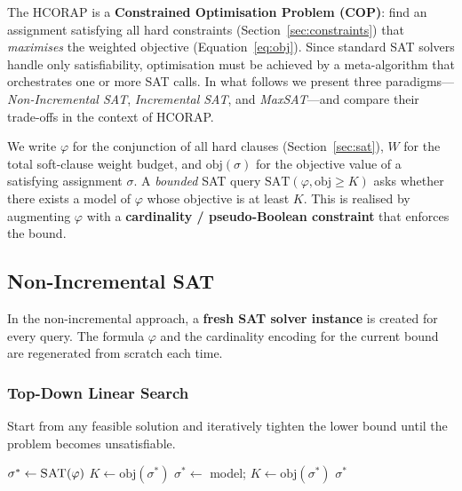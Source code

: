\documentclass[11pt,a4paper]{article}
\begin{document}
The HCORAP is a \textbf{Constrained Optimisation Problem (COP)}: find an
assignment satisfying all hard constraints (Section~\ref{sec:constraints}) that
\emph{maximises} the weighted objective
(Equation~\ref{eq:obj}).  Since standard SAT solvers handle only
satisfiability, optimisation must be achieved by a meta-algorithm that
orchestrates one or more SAT calls.  In what follows we present three
paradigms---\emph{Non-Incremental SAT}, \emph{Incremental SAT}, and
\emph{MaxSAT}---and compare their trade-offs in the context of HCORAP.

We write $\varphi$ for the conjunction of all hard clauses
(Section~\ref{sec:sat}), $W$ for the total soft-clause weight budget,
and $\mathrm{obj}(\sigma)$ for the objective value of a satisfying
assignment $\sigma$.
A \emph{bounded} SAT query $\mathrm{SAT}(\varphi, \mathrm{obj} \ge K)$
asks whether there exists a model of $\varphi$ whose objective is at
least $K$.  This is realised by augmenting $\varphi$ with a
\textbf{cardinality / pseudo-Boolean constraint} that enforces the bound.

\subsection{Non-Incremental SAT}\label{sec:opt-nonincr}

In the non-incremental approach, a \textbf{fresh SAT solver instance} is
created for every query.  The formula $\varphi$ and the cardinality encoding
for the current bound are regenerated from scratch each time.

\subsubsection{Top-Down Linear Search}

Start from any feasible solution and iteratively tighten the lower bound until
the problem becomes unsatisfiable.

\begin{algorithm}[H]
\caption{Non-Incremental Top-Down Linear Search (maximisation)}
\label{alg:topdown}
\begin{algorithmic}[1]
\State $\sigma^* \leftarrow \textsc{SAT}(\varphi)$
\State $K \leftarrow \mathrm{obj}(\sigma^*)$
    \State $\sigma^* \leftarrow$ model;
           \;$K \leftarrow \mathrm{obj}(\sigma^*)$
\EndWhile
\State \Return $\sigma^*$     
\end{algorithmic}
\end{algorithm}
\end{document}
